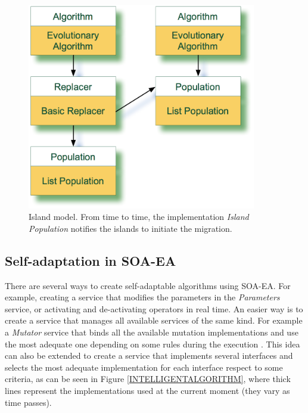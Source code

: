 \begin{figure}
\centering
\includegraphics[width=10cm]{gfx/soaea/island.jpg}
\caption{Island model. From time to time, the implementation {\em Island Population} notifies the islands to initiate the migration.}
\label{POPULATION}
\end{figure}



\subsection{Self-adaptation in SOA-EA}
\label{sec:otherexamples}
There are several ways to create self-adaptable algorithms using SOA-EA. For example, creating a service that modifies the parameters in the {\em Parameters} service, or activating and de-activating operators in real time. An easier way is to create a service that manages all available services of the same kind. For example a {\em Mutator} service that binds all the available mutation implementations and use the most adequate one depending on some rules during the execution \citep{MUTATIONADAPTATION10}.  This idea can also be extended to create a service that implements several interfaces and selects the most adequate implementation for each interface respect to some criteria, as can be seen in Figure \ref{INTELLIGENTALGORITHM}, where thick lines represent the implementations used at the current moment (they vary as time passes).



